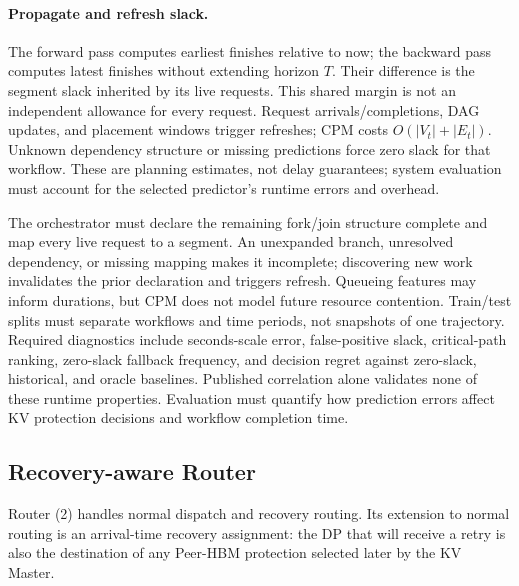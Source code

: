 \paragraph{Propagate and refresh slack.}
The forward pass computes earliest finishes relative to now; the
backward pass computes latest finishes without extending horizon $T$.
Their difference is the segment slack inherited by its live requests.
This shared margin is not an independent allowance for every request.
Request arrivals/completions, DAG updates, and placement windows trigger
refreshes; CPM costs $O(|V_t|+|E_t|)$. Unknown dependency structure or missing
predictions force zero slack for that workflow. These are planning
estimates, not delay guarantees; system evaluation must account for
the selected predictor's runtime errors and overhead.

The orchestrator must declare the remaining fork/join structure complete
and map every live request to a segment. An unexpanded branch, unresolved
dependency, or missing mapping makes it incomplete; discovering new work
invalidates the prior declaration and triggers refresh. Queueing features
may inform durations, but CPM does not model future resource contention.
Train/test splits must separate workflows and time periods, not snapshots
of one trajectory. Required diagnostics include seconds-scale error,
false-positive slack, critical-path ranking, zero-slack fallback frequency,
and decision regret against zero-slack, historical, and oracle baselines.
Published correlation alone validates none of these runtime properties.
Evaluation must quantify how prediction errors affect KV protection
decisions and workflow completion time.
\subsection{Recovery-aware Router}
\label{sec:parallel-recovery}
\label{sec:recovery-router}

Router (2) handles normal dispatch and recovery routing.
Its extension to normal routing is an arrival-time recovery assignment:
the DP that will receive a retry is also the destination of any
Peer-HBM protection selected later by the KV Master.

